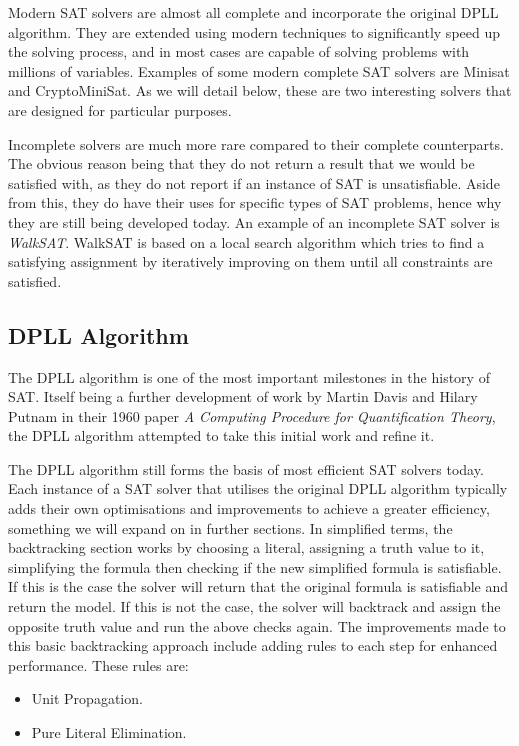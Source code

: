 \documentclass{article}
\begin{document}
Modern SAT solvers are almost all complete and incorporate the original DPLL algorithm. They are extended using modern techniques to significantly speed up the solving process, and in most cases are capable of solving problems with millions of variables. Examples of some modern complete SAT solvers are Minisat and CryptoMiniSat. As we will detail below, these are two interesting solvers that are designed for particular purposes.

Incomplete solvers are much more rare compared to their complete counterparts. The obvious reason being that they do not return a result that we would be satisfied with, as they do not report if an instance of SAT is unsatisfiable. Aside from this, they do have their uses for specific types of SAT problems, hence why they are still being developed today. An example of an incomplete SAT solver is \textit{WalkSAT}. WalkSAT is based on a local search algorithm which tries to find a satisfying assignment by iteratively improving on them until all constraints are satisfied.

\subsection{DPLL Algorithm}
The DPLL algorithm is one of the most important milestones in the history of SAT. Itself being a further development of work by Martin Davis and Hilary Putnam in their 1960 paper \textit{A Computing Procedure for Quantification Theory}\cite{putnam}, the DPLL algorithm attempted to take this initial work and refine it.

The DPLL algorithm still forms the basis of most efficient SAT solvers today. Each instance of a SAT solver that utilises the original DPLL algorithm typically adds their own optimisations and improvements to achieve a greater efficiency, something we will expand on in further sections. In simplified terms, the backtracking section works by choosing a literal, assigning a truth value to it, simplifying the formula then checking if the new simplified formula is satisfiable. If this is the case the solver will return that the original formula is satisfiable and return the model. If this is not the case, the solver will backtrack and assign the opposite truth value and run the above checks again. The improvements made to this basic backtracking approach include adding rules to each step for enhanced performance. These rules are:

\begin{itemize}
    \item Unit Propagation.
    \item Pure Literal Elimination.
\end{itemize}
\end{document}
